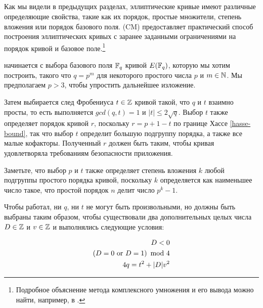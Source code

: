 \subsection{}\label{complex-multiplication-method}
Как мы видели в предыдущих разделах, эллиптические кривые имеют различные определяющие свойства, такие как их порядок, простые множители, степень вложения или порядок базового поля.  (CM) предоставляет практический способ построения эллиптических кривых с заранее заданными ограничениями на порядок кривой и базовое поле.\footnote{Подробное объяснение метода комплексного умножения
и его вывода можно найти, например, в \cite{grech-2012}.}


 начинается с выбора базового поля $\mathbb{F}_{q}$ кривой $E(\mathbb{F}_q)$, которую мы хотим построить, такого что $q = p^m$ для некоторого простого числа $p$ и $m\in \mathbb{N}$. Мы предполагаем $p>3$, чтобы упростить дальнейшее изложение. 

Затем выбирается след Фробениуса $t\in \mathbb{Z}$ кривой такой, что $q$ и $t$ взаимно просты, то есть выполняется $gcd(q,t)=1$ и $|t|\leq 2\sqrt{q}$. Выбор $t$ также определяет порядок кривой $r$, поскольку $r=p+1-t$ по границе Хассе \eqref{hasse-bound}, так что выбор $t$ определит большую подгруппу порядка, а также все малые кофакторы. Полученный $r$ должен быть таким, чтобы кривая удовлетворяла требованиям безопасности приложения. 

Заметьте, что выбор $p$ и $t$ также определяет степень вложения $k$ любой подгруппы простого порядка кривой, поскольку $k$ определяется как наименьшее число такое, что простой порядок $n$ делит число $p^k-1$.

Чтобы  работал, ни $q$, ни $t$ не могут быть произвольными, но должны быть выбраны таким образом, чтобы существовали два дополнительных целых числа $D\in \mathbb{Z}$ и $v\in \mathbb{Z}$ и выполнялись следующие условия:

\begin{equation}\label{eq:D-criteria}
\begin{split}
D<0\\
\left( D =0  \text{ or } D=1\right) \text{ mod } 4\\
4q  = t^2 + |D|v^2 
\end{split}
\end{equation}

